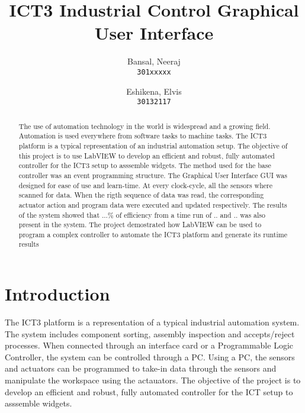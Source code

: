 \documentclass[12pt]{article}
\title{
  ICT3 Industrial Control Graphical User Interface
}
\author{
  Bansal, Neeraj\\
  \texttt{301xxxxx}
  \and
  Eshikena, Elvis\\
  \texttt{30132117}
}
\begin{document}
\maketitle

\begin{abstract}
  The use of automation technology in the world is wide\-spread and a growing field.
  Automation is used every\-where from software tasks to machine tasks. The ICT3 platform
  is a typical representation of an industrial automation setup. The objective of this
  project is to use LabVIEW to develop an efficient and robust, fully automated 
  controller for the ICT3 setup to asssemble widgets.
  \bigbreak
  The method used for the base controller was an event prog\-ramming struc\-ture. The
  Graphical User Interface GUI was designed for ease of use and learn-time. At
  every clock-cycle, all the sensors where scanned for data. When the rigth
  sequence of data was read, the corresponding actuator action and program data
  were executed and updated respectively.
  \bigbreak
  The results of the system showed that ...\% of efficiency from a time run of ..
  and .. was also present in the system.
  \bigbreak
  The project demostrated how LabVIEW can be used to program a complex controller
  to automate the ICT3 platform and generate its runtime results
\end{abstract}
\newpage

\tableofcontents
\newpage

\section{Introduction}
  The ICT3 platform is a representation of a typical industrial automation 
  system. The system includes component sorting, assembly inspection and 
  accepts/reject processes. When connected through an interface card or a 
  Programmable Logic Controller, the system can
  be controlled through a PC.
  \bigbreak
  Using a PC, the sensors and actuators can be programmed to
  take-in data through the sensors and manipulate the workspace using the 
  actauators.
  \bigbreak
  The objective of the project is to develop an efficient and robust, fully 
  automated controller for the ICT setup to asssemble widgets.

\end{document}
